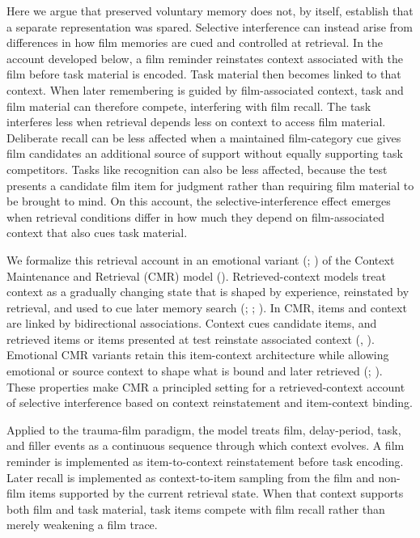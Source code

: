 \documentclass[
  man,
  floatsintext,
  longtable,
  nolmodern,
  notxfonts,
  notimes,
  draftfirst,
  colorlinks=true,linkcolor=blue,citecolor=blue,urlcolor=blue]{apa7}
\begin{document}
Here we argue that preserved voluntary memory does not, by itself,
establish that a separate representation was spared. Selective
interference can instead arise from differences in how film memories are
cued and controlled at retrieval. In the account developed below, a film
reminder reinstates context associated with the film before task
material is encoded. Task material then becomes linked to that context.
When later remembering is guided by film-associated context, task and
film material can therefore compete, interfering with film recall. The
task interferes less when retrieval depends less on context to access
film material. Deliberate recall can be less affected when a maintained
film-category cue gives film candidates an additional source of support
without equally supporting task competitors. Tasks like recognition can
also be less affected, because the test presents a candidate film item
for judgment rather than requiring film material to be brought to mind.
On this account, the selective-interference effect emerges when
retrieval conditions differ in how much they depend on film-associated
context that also cues task material.

We formalize this retrieval account in an emotional variant
(;
) of the Context
Maintenance and Retrieval (CMR) model
().
Retrieved-context models treat context as a gradually changing state
that is shaped by experience, reinstated by retrieval, and used to cue
later memory search (; ;
). In CMR,
items and context are linked by bidirectional associations. Context cues
candidate items, and retrieved items or items presented at test
reinstate associated context (, ). Emotional CMR
variants retain this item-context architecture while allowing emotional
or source context to shape what is bound and later retrieved
(;
). These properties
make CMR a principled setting for a retrieved-context account of
selective interference based on context reinstatement and item-context
binding.

Applied to the trauma-film paradigm, the model treats film,
delay-period, task, and filler events as a continuous sequence through
which context evolves. A film reminder is implemented as item-to-context
reinstatement before task encoding. Later recall is implemented as
context-to-item sampling from the film and non-film items supported by
the current retrieval state. When that context supports both film and
task material, task items compete with film recall rather than merely
weakening a film trace.
\end{document}

